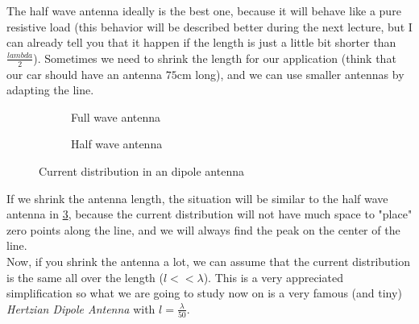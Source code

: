The half wave antenna ideally is the best one, because it will behave like a pure resistive load\cite{Antenne_appunti_tlc} (this behavior will be described better during the next lecture, but I can already tell you that it happen if the length is just a little bit shorter than $\frac{lambda}{2}$). Sometimes we need to shrink the length for our application (think that our car should have an antenna $75\si{\centi\metre}$ long), and we can use smaller antennas by adapting the line.
\begin{figure}[H]
        \centering
        \begin{subfigure}[b]{0.45\textwidth}\centering
        \caption{Full wave antenna}\label{fig:Full_wave_antenna} 
    \end{subfigure}%
    \hfill
    \begin{subfigure}[b]{0.45\textwidth}\centering
        \caption{Half wave antenna}\label{fig:Half_wave_antenna}
    \end{subfigure}\caption{Current distribution in an dipole antenna}
\end{figure}
If we shrink the antenna length, the situation will be similar to the half wave antenna in \cref{fig:Half_wave_antenna}, because the current distribution will not have much space to "place" zero points along the line, and we will always find the peak on the center of the line.\\
Now, if you shrink the antenna a lot, we can assume that the current distribution is the same all over the length ($l<<\lambda$). This is a very appreciated simplification so what we are going to study now on is a very famous (and tiny) \emph{Hertzian Dipole Antenna} with $l=\frac{\lambda}{50}$.
